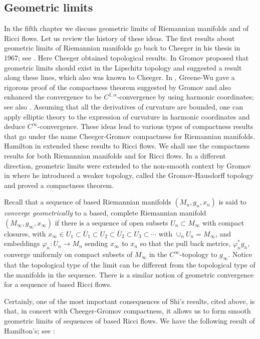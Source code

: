 \subsection{Geometric limits}


In the fifth chapter we discuss geometric
limits of Riemannian manifolds and of Ricci flows. Let us review the
history of these ideas. The first results about geometric limits of
Riemannian manifolds go back to Cheeger in his thesis in 1967; see
\cite{Cheeger}. Here Cheeger obtained topological results. In
\cite{Gromov} Gromov proposed that geometric limits should exist in
the Lipschitz topology and suggested a result along these lines,
which also was known to Cheeger.
 In
\cite{GreeneWu}, Greene-Wu gave a rigorous proof of the compactness
theorem suggested by Gromov and also enhanced the convergence to be
$C^{1,\alpha}$-convergence by using harmonic coordinates; see also
\cite{SPeters}. Assuming that all the derivatives of curvature are
bounded, one can apply elliptic theory to the expression of
curvature in harmonic coordinates and deduce $C^\infty$-convergence.
These ideas lead to various types of compactness results  that go
under the name Cheeger-Gromov compactness for Riemannian manifolds.
Hamilton in \cite{Hamiltonlimits} extended these results to Ricci
flows. We shall use the compactness results for both Riemannian
manifolds and for Ricci flows. In a different direction, geometric
limits were extended to the non-smooth context by Gromov in
\cite{Gromov} where he introduced a weaker topology, called the
Gromov-Hausdorff topology and proved a compactness theorem.



 Recall that a
sequence of based Riemannian manifolds $(M_n,g_n,x_n)$ is said to
{\em converge geometrically} to a
based, complete Riemannian manifold $(M_\infty,g_\infty,x_\infty)$
if there is a sequence of open subsets $U_n\subset M_\infty$ with
compact closures, with $x_\infty\in U_1\subset \overline U_1\subset
U_2\subset \overline U_2\subset U_3\subset \cdots $ with
$\cup_nU_n=M_\infty$, and embeddings $\varphi_n\colon U_n\to M_n$
sending $x_\infty$ to $x_n$ so that the pull back metrics,
$\varphi_n^*g_n$, converge uniformly on compact subsets of
$M_\infty$ in the $C^\infty$-topology to $g_\infty$. Notice that the
topological type of the limit can be different from the topological
type of the manifolds in the sequence. There is a similar notion of
geometric convergence for a sequence of based Ricci flows.

Certainly, one of the most important consequences of Shi's results,
cited above, is that, in concert with  Cheeger-Gromov  compactness,
it allows us to form smooth geometric limits of sequences of based
Ricci flows. We have the following result of Hamilton's; see
\cite{Hamiltonlimits}:

